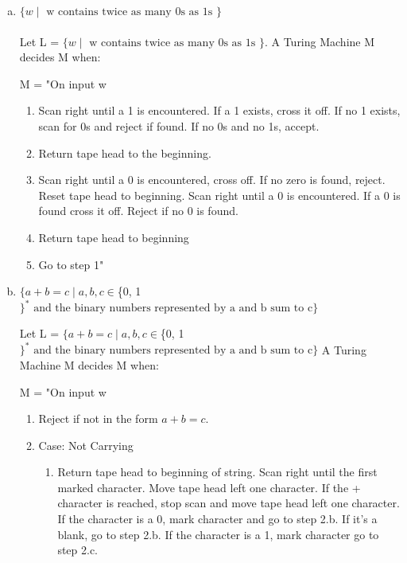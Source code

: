 ﻿\documentclass{article}
\begin{document}
\begin{enumerate}[a)]

\item $\{w \;|\; \text{ w contains twice as many 0s as 1s } \}$
\\ \\Let L = $\{w \;|\; \text{ w contains twice as many 0s as 1s } \}$. A Turing Machine M decides M when:

M = "On input w

\begin{enumerate}[1)]
\item Scan right until a 1 is encountered. If a 1 exists, cross it off. If no 1 exists, scan for 0s and reject if found. If no 0s and no 1s, accept.
\item Return tape head to the beginning.
\item Scan right until a 0 is encountered, cross off. If no zero is found, reject. Reset tape head to beginning. Scan right until a 0 is encountered. If a 0 is found cross it off. Reject if no 0 is found.
\item Return tape head to beginning
\item Go to step 1"
\end{enumerate}


\item  $\{a + b = c \;|\; a, b, c \in $\{0, 1$\}^* \text{ and the binary numbers represented by a and b sum to c} \}$

Let L = $\{a + b = c \;|\; a, b, c \in $\{0, 1$\}^* \text{ and the binary numbers represented by a and b sum to c} \}$ A Turing Machine M decides M when:

M = "On input w

\begin{enumerate}[1)]

\item Reject if not in the form $a + b = c$.



\item Case: Not Carrying

    \begin{enumerate}[(2.a)]
    
    \item Return tape head to beginning of string. Scan right until the first marked character. Move tape head left one character. If the + character is reached, stop scan and move tape head left one character. If the character is a 0, mark character and go to step 2.b. If it's a blank, go to step 2.b. If the character is a 1, mark character go to step 2.c.


\end{enumerate}
\end{enumerate}
\end{enumerate}
\end{document}
